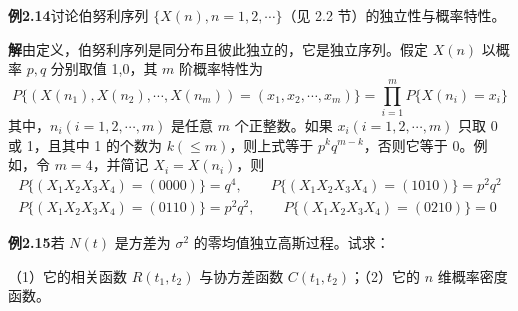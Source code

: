 \documentclass[11pt,openany,UTF8]{ctexbook}
\begin{document}
\begin{examplebox}
\textbf{例2.14}\quad 讨论伯努利序列 $\{X(n),n=1,2,\cdots\}$（见 2.2 节\nobreak）的独立性与概率特性\nobreak。

\textbf{解}\quad 由定义\nobreak，伯努利序列是同分布且彼此独立的\nobreak，它是独立序列\nobreak。假定 $X(n)$ 以概率 $p,q$ 分别取值 1,0\nobreak，其 $m$ 阶概率特性为
\[
P\{(X(n_1),X(n_2),\cdots,X(n_m))=(x_1,x_2,\cdots,x_m)\}=\prod_{i=1}^{m}P\{X(n_i)=x_i\}
\]
其中\nobreak，$n_i(i=1,2,\cdots,m)$ 是任意 $m$ 个正整数\nobreak。如果 $x_i(i=1,2,\cdots,m)$ 只取 0 或 1\nobreak，且其中 1 的个数为 $k(\leqslant m)$\nobreak，则上式等于 $p^kq^{m-k}$\nobreak，否则它等于 0\nobreak。例如\nobreak，令 $m=4$\nobreak，并简记 $X_i=X(n_i)$\nobreak，则
\[
\begin{gathered}
P\{(X_1X_2X_3X_4)=(0000)\}=q^4,\qquad P\{(X_1X_2X_3X_4)=(1010)\}=p^2q^2\\
P\{(X_1X_2X_3X_4)=(0110)\}=p^2q^2,\qquad P\{(X_1X_2X_3X_4)=(0210)\}=0
\end{gathered}
\]

\textbf{例2.15}\quad 若 $N(t)$ 是方差为 $\sigma^2$ 的零均值独立高斯过程\nobreak。试求\nobreak：

（1\nobreak）它的相关函数 $R(t_1,t_2)$ 与协方差函数 $C(t_1,t_2)$\nobreak；（2\nobreak）它的 $n$ 维概率密度函数\nobreak。


\end{examplebox}
\end{document}
